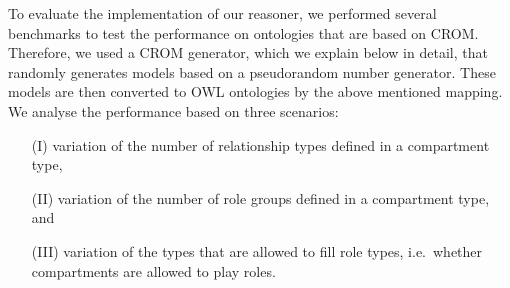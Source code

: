 To evaluate the implementation of our reasoner, we performed several benchmarks to test the
performance on ontologies that are based on CROM. Therefore, we used a CROM generator, which we explain
below in detail, that randomly generates models based on a pseudorandom number generator. These models are
then converted to OWL ontologies by the above mentioned mapping. We analyse the performance based on
three scenarios:
\begin{enumerate}[leftmargin=30pt]
\item[(I)] variation of the number of relationship types defined in a compartment type,
\item[(II)] variation of the number of role groups defined in a compartment type, and
\item[(III)] variation of the types that are allowed to fill role types, i.e.\ whether compartments
  are allowed to play roles.
\end{enumerate}



